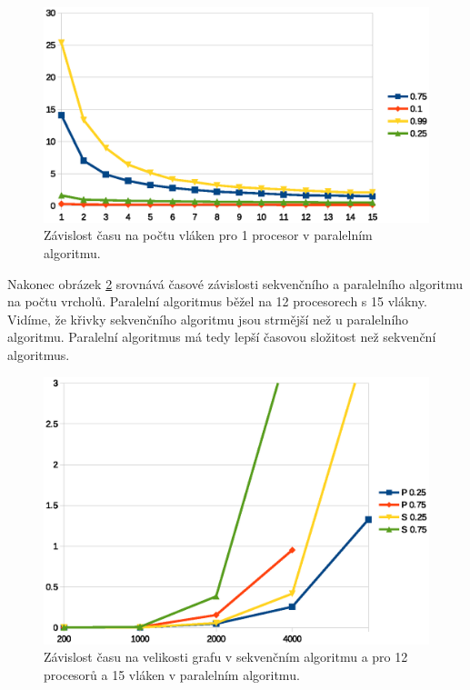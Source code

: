 \documentclass[a4paper, 11pt, titlepage, final]{article}[3. prosinec 2011]
\begin{document}
\begin{figure}[ht]
  \centering
  \includegraphics[scale=0.8]{img/paral_t_1.eps}
  \caption{Závislost času na počtu vláken pro 1 procesor v paralelním algoritmu.}
  \label{imgPT1}
\end{figure}

Nakonec obrázek \ref{imgPPS} srovnává časové závislosti sekvenčního a paralelního algoritmu na počtu vrcholů. Paralelní algoritmus běžel na 12 procesorech s 15 vlákny. Vidíme, že křivky sekvenčního algoritmu jsou strmější než u paralelního algoritmu. Paralelní algoritmus má tedy lepší časovou složitost než sekvenční algoritmus.

\begin{figure}[ht]
  \centering
  \includegraphics[scale=0.8]{img/paral_sequence.eps}
  \caption{Závislost času na velikosti grafu v sekvenčním algoritmu a pro 12 procesorů a 15 vláken v paralelním algoritmu.}
  \label{imgPPS}
\end{figure}
\end{document}
